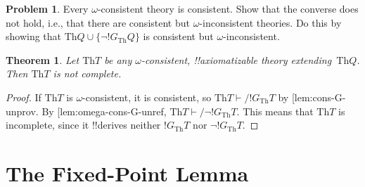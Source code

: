 \documentclass[10pt,a4paper]{article}
\makeatletter
\theoremstyle{plain}
\newtheorem{thm}{Theorem}[section]
\theoremstyle{definition}
\newtheorem{prob}{Problem}[section]
\theoremstyle{remark}
\newcommand*{\olfileid}[3]{}
\newcommand*{\olsection}[1]{\section*{#1}}
\newcommand*{\ollabel}[1]{\label{#1}}
\newcommand{\olref}{\@ifnextchar[{\olref@i}{\olref@final}}
\def\olref@i[#1]{\@ifnextchar[{\olref@ii}{\olref@final}}
\def\olref@ii[#1]{\@ifnextchar[{\olref@iii}{\olref@final}}
\def\olref@iii[#1]{\olref@final}
\def\olref@final#1{\ref{#1}}
\providecommand{\Proves}{\mathrel{\vdash}}
\providecommand{\Th}{\ensuremath{\mathrm{Th}}}
\makeatother
\begin{document}
\begin{prob}
  Every $\omega$-consistent theory is consistent. Show that the
  converse does not hold, i.e., that there are consistent but
  $\omega$-inconsistent theories. Do this by showing that $\Th{Q} \cup
  \{\lnot !G_\Th{Q}\}$ is consistent but $\omega$-inconsistent.
\end{prob}

\begin{thm}
\ollabel{thm:first-incompleteness} Let $\Th{T}$ be any
$\omega$-consistent, !!{axiomatizable} theory extending~$\Th{Q}$. Then
$\Th{T}$ is not complete.
\end{thm}

\begin{proof}
  If $\Th{T}$ is $\omega$-consistent, it is consistent, so $\Th{T}
  \Proves/ !G_\Th{T}$ by \olref{lem:cons-G-unprov}.  By
  \olref{lem:omega-cons-G-unref}, $\Th{T} \Proves/ \lnot !G_\Th{T}$.
  This means that $\Th{T}$ is incomplete, since it !!{derive}s neither
  $!G_\Th{T}$ nor $\lnot !G_\Th{T}$.
\end{proof}





\olfileid{inc}{inp}{fix}

\olsection{The Fixed-Point Lemma}
\end{document}
